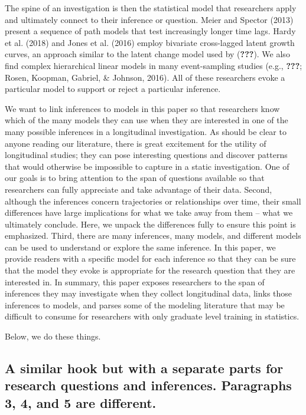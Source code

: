 \documentclass[english,,man]{apa6}
\theoremstyle{definition}
\theoremstyle{definition}
\theoremstyle{definition}
\theoremstyle{remark}
\begin{document}
The spine of an investigation is then the statistical model that
researchers apply and ultimately connect to their inference or question.
Meier and Spector (2013) present a sequence of path models that test
increasingly longer time lags. Hardy et al. (2018) and Jones et al.
(2016) employ bivariate cross-lagged latent growth curves, an approach
similar to the latent change model used by ({\textbf{???}}). We also
find complex hierarchical linear models in many event-sampling studies
(e.g., {\textbf{???}}; Rosen, Koopman, Gabriel, \& Johnson, 2016). All
of these researchers evoke a particular model to support or reject a
particular inference.

We want to link inferences to models in this paper so that researchers
know which of the many models they can use when they are interested in
one of the many possible inferences in a longitudinal investigation. As
should be clear to anyone reading our literature, there is great
excitement for the utility of longitudinal studies; they can pose
interesting questions and discover patterns that would otherwise be
impossible to capture in a static investigation. One of our goals is to
bring attention to the span of questions available so that researchers
can fully appreciate and take advantage of their data. Second, although
the inferences concern trajectories or relationships over time, their
small differences have large implications for what we take away from
them -- what we ultimately conclude. Here, we unpack the differences
fully to ensure this point is emphasized. Third, there are many
inferences, many models, and different models can be used to understand
or explore the same inference. In this paper, we provide readers with a
specific model for each inference so that they can be sure that the
model they evoke is appropriate for the research question that they are
interested in. In summary, this paper exposes researchers to the span of
inferences they may investigate when they collect longitudinal data,
links those inferences to models, and parses some of the modeling
literature that may be difficult to consume for researchers with only
graduate level training in statistics.

Below, we do these things.

\hypertarget{a-similar-hook-but-with-a-separate-parts-for-research-questions-and-inferences.-paragraphs-3-4-and-5-are-different.}{%
\subsection{A similar hook but with a separate parts for research
questions and inferences. Paragraphs 3, 4, and 5 are
different.}\label{a-similar-hook-but-with-a-separate-parts-for-research-questions-and-inferences.-paragraphs-3-4-and-5-are-different.}}
\end{document}
